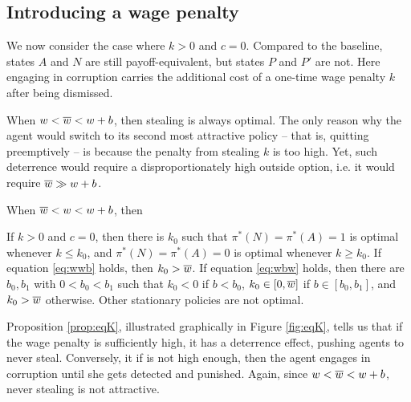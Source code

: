 {\subsection{Introducing a wage penalty}

We now consider the case where $k > 0$ and $c = 0$. Compared to the baseline, states $A$ and $N$ are still payoff-equivalent, but states $P$ and $P'$ are not. Here engaging in corruption carries the additional cost of a one-time wage penalty $k$ after being dismissed. 

When $w < \overline{w} < w+b$, then stealing is always optimal. The only reason why the agent would switch to its second most attractive policy -- that is, quitting preemptively -- is because the penalty from stealing $k$ is too high. Yet, such deterrence would require a disproportionately high outside option, i.e. it would require $\overline{w} \gg w+b$. 

When $\overline{w} < w < w+b$, then 
\begin{proposition}
    \label{prop:eqK}
    If $k > 0$ and $c = 0$, then there is $k_0$ such that $\pi^*(N)=\pi^*(A)=1$ is optimal whenever $k \leq k_0$, and $\pi^*(N)=\pi^*(A)=0$ is optimal whenever $k \geq k_0$. If equation \ref{eq:wwb} holds, then $k_0 > \overline{w}$. If equation \ref{eq:wbw} holds, then there are $b_0, b_1$ with $0 < b_0 < b_1$ such that $k_0 < 0$ if $b < b_0$, $k_0 \in [0,\overline{w}]$ if $b \in [b_0, b_1]$, and $k_0 > \overline{w}$ otherwise. Other stationary policies are not optimal. 
\end{proposition}
Proposition \ref{prop:eqK}, illustrated graphically in Figure \ref{fig:eqK}, tells us that if the wage penalty is sufficiently high, it has a deterrence effect, pushing agents to never steal. Conversely, it if is not high enough, then the agent engages in corruption until she gets detected and punished. Again, since $w < \overline{w} < w+b$, never stealing is not attractive. 

}
